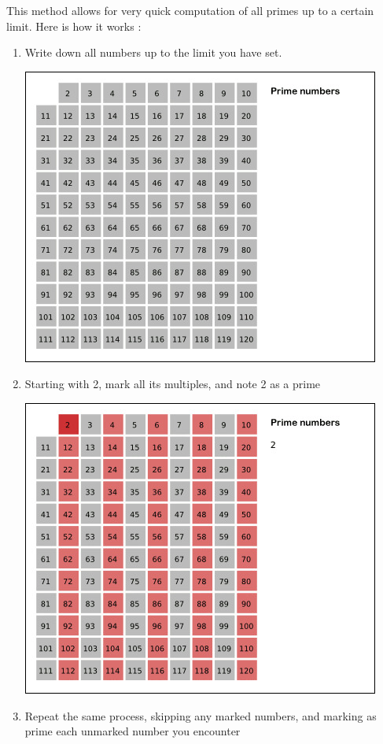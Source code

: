 \documentclass[12pt, titlepage]{article}
\begin{document}
This method allows for very quick computation of all primes up to a certain limit. Here is
how it works \autocite{wikipedia_eratosthenes_animation}:
%
\begin{enumerate}
    \item Write down all numbers up to the limit you have set.

        \includegraphics[scale=0.6]{base}
    \item Starting with 2, mark all its multiples, and note 2 as a prime

        \includegraphics[scale=0.6]{2}\\
    \item Repeat the same process, skipping any marked numbers, and marking
        as prime each unmarked number you encounter


\end{enumerate}
\end{document}
